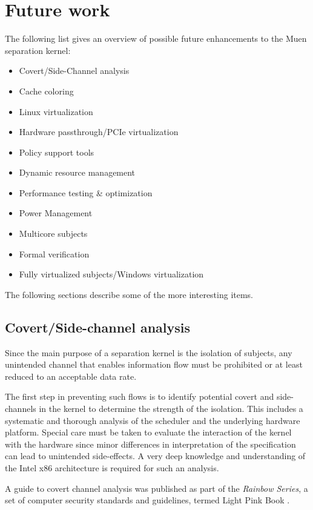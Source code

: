 \section{Future work}
The following list gives an overview of possible future enhancements to the
Muen separation kernel:

\begin{itemize}
	\item Covert/Side-Channel analysis
	\item Cache coloring
	\item Linux virtualization
	\item Hardware passthrough/PCIe virtualization
	\item Policy support tools
	\item Dynamic resource management
	\item Performance testing \& optimization
	\item Power Management
	\item Multicore subjects
	\item Formal verification
	\item Fully virtualized subjects/Windows virtualization
\end{itemize}

The following sections describe some of the more interesting items.

\subsection{Covert/Side-channel analysis}
Since the main purpose of a separation kernel is the isolation of subjects, any
unintended channel that enables information flow must be prohibited or at least
reduced to an acceptable data rate.

The first step in preventing such flows is to identify potential covert and
side-channels in the kernel to determine the strength of the isolation. This
includes a systematic and thorough analysis of the scheduler and the underlying
hardware platform. Special care must be taken to evaluate the interaction of the
kernel with the hardware since minor differences in interpretation of the
specification can lead to unintended side-effects. A very deep knowledge and
understanding of the Intel x86 architecture is required for such an analysis.

A guide to covert channel analysis was published as part of the
\emph{Rainbow Series}, a set of computer security standards and guidelines,
termed Light Pink Book \cite{LightPinkBook}.

